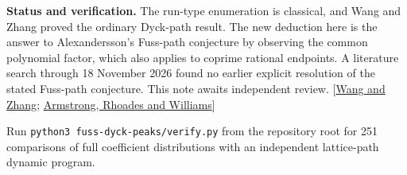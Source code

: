 \documentclass[11pt]{article}
\begin{document}
\small
\textbf{Status and verification.} The run-type enumeration is classical, and Wang and Zhang proved the ordinary Dyck-path result. The new deduction here is the answer to Alexandersson's Fuss-path conjecture by observing the common polynomial factor, which also applies to coprime rational endpoints. A literature search through 18 November 2026 found no earlier explicit resolution of the stated Fuss-path conjecture. This note awaits independent review. [\href{https://doi.org/10.37236/12375}{Wang and Zhang}; \href{https://www.combinatorics.org/ojs/index.php/eljc/article/view/v20i3p54}{Armstrong, Rhoades and Williams}]

Run \texttt{python3 fuss-dyck-peaks/verify.py} from the repository root for 251 comparisons of full coefficient distributions with an independent lattice-path dynamic program.
\end{document}
